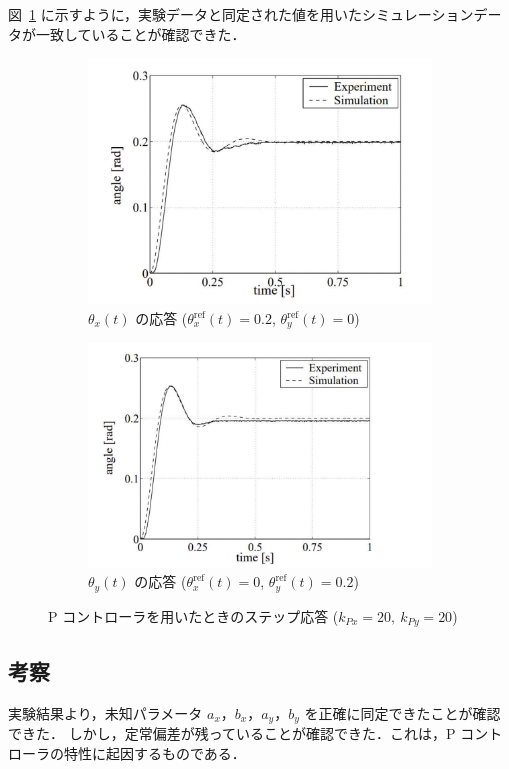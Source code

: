 図~\ref{fig:step_response2} に示すように，実験データと同定された値を用いたシミュレーションデータが一致していることが確認できた．

\begin{figure}[htbp]
    \centering
    \begin{subfigure}[b]{0.45\linewidth}
        \centering
        \includegraphics[width=\linewidth]{figure/thetax_response2.pdf}
        \caption{$\theta_x(t)$ の応答 ($\theta_x^{\mathrm{ref}}(t) = 0.2$, $\theta_y^{\mathrm{ref}}(t) = 0$)}
    \end{subfigure}
    \hfill
    \begin{subfigure}[b]{0.45\linewidth}
        \centering
        \includegraphics[width=\linewidth]{figure/thetay_response2.pdf}
        \caption{$\theta_y(t)$ の応答 ($\theta_x^{\mathrm{ref}}(t) = 0$, $\theta_y^{\mathrm{ref}}(t) = 0.2$)}
    \end{subfigure}
    \caption{P コントローラを用いたときのステップ応答 ($k_{Px}=20,\ k_{Py}=20$)}
    \label{fig:step_response2}
\end{figure}


\subsection{考察}
実験結果より，未知パラメータ $a_x$，$b_x$，$a_y$，$b_y$ を正確に同定できたことが確認できた．
しかし，定常偏差が残っていることが確認できた．これは，P コントローラの特性に起因するものである．

